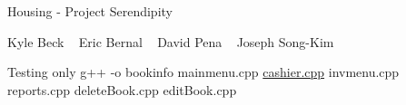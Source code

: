 Housing -\/ Project Serendipity

Kyle Beck ~\newline
 Eric Bernal ~\newline
 David Pena ~\newline
 Joseph Song-\/\+Kim ~\newline


Testing only g++ -\/o bookinfo mainmenu.\+cpp \mbox{\hyperlink{cashier_8cpp}{cashier.\+cpp}} invmenu.\+cpp reports.\+cpp delete\+Book.\+cpp edit\+Book.\+cpp 